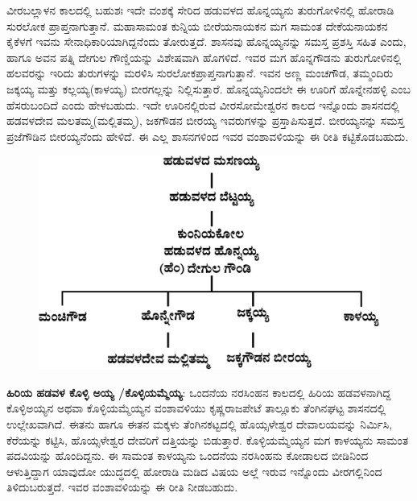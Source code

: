 ವೀರಬಲ್ಲಾಳನ ಕಾಲದಲ್ಲಿ ಬಹುಶಃ ಇದೇ ವಂಶಕ್ಕೆ ಸೇರಿದ ಹಡುವಳದ ಹೊನ್ನಯ್ಯನು ತುರುಗೋಳಿನಲ್ಲಿ ಹೋರಾಡಿ ಸುರಲೋಕ ಪ್ರಾಪ್ತನಾಗುತ್ತಾನೆ. ಮಹಾಸಾಮಂತ ಕುನ್ನಿಯ ಬೀರೆಯನಾಯಕನ ಮಗ ಸಾಮಂತ ದೇಕೆಯನಾಯಕನ ಕೈಕೆಳಗೆ ಇವನು ಸೇನಾಧಿಕಾರಿಯಾಗಿದ್ದನೆಂದು ತೋರುತ್ತದೆ. ಶಾಸನವು ಹೊನ್ನಯ್ಯನನ್ನು ಸಮಸ್ತ ಪ್ರಶಸ್ತಿ ಸಹಿತ ಎಂದು, ಹಾಗೂ ಅವನ ಪತ್ನಿ ದೇಗುಲ ಗೌಣ್ಡಿಯನ್ನು ವಿಶೇಷವಾಗಿ ಹೊಗಳಿದೆ. ಇವರ ಮಗ ಹೊನ್ನಗೌಡನು ತುರುಗೋಳಿನಲ್ಲಿ ಹಲವರನ್ನು ಇರಿದು ತುರುಗಳನ್ನು ಮರಳಿಸಿ ಸುರಲೋಕಪ್ರಾಪ್ತನಾಗುತ್ತಾನೆ. ಇವನ ಅಣ್ಣ ಮಂಚಗೌಡ, ತಮ್ಮಂದಿರು ಜಕ್ಕಯ್ಯ ಮತ್ತು ಕಲ್ಲಯ್ಯ(ಕಾಳಯ್ಯ) ಬೀರಗಲ್ಲನ್ನು ನಿಲ್ಲಿಸುತ್ತಾರೆ. ಹೊನ್ನಯ್ಯನಿಂದಲೇ ಈ ಊರಿಗೆ ಹೊನ್ನೇನಹಳ್ಳಿ ಎಂಬ ಹೆಸರುಬಂದಿದೆ ಎಂದು ಹೇಳಬಹುದು. ಇದೇ ಊರಿನಲ್ಲಿರುವ ವೀರಸೋಮೇಶ್ವರನ ಕಾಲದ ಇನ್ನೊಂದು ಶಾಸನದಲ್ಲಿ ಹಡವಳದೇವ ಮಲತಮ್ಮ(ಮಲ್ಲಿತಮ್ಮ), ಜಕಗೌಡನ ಬೀರಯ್ಯ ಇವರುಗಳನ್ನು ಪ್ರಸ್ತಾಪಿಸುತ್ತದೆ. ಬೀರಯ್ಯನನ್ನು ಸಮಸ್ತ ಪ್ರಜೆಗೌಡಿನ ಬೀರಯ್ಯನೆಂದು ಹೇಳಿದೆ. ಈ ಎಲ್ಲ ಶಾಸನಗಳಿಂದ ಇವರ ವಂಶಾವಳಿಯನ್ನು ಈ ರೀತಿ ಕಟ್ಟಿಕೊಡಬಹುದು.

\begin{figure}[H]
\includegraphics[scale=.15]{images/chap3/chap3fig32.jpeg}
\end{figure}

\textbf{ಹಿರಿಯ ಹಡವಳ ಕೊಳ್ಳಿ ಅಯ್ಯ /ಕೊಳ್ಳಿಯಮ್ಮೆಯ್ಯ}: ಒಂದನೆಯ ನರಸಿಂಹನ ಕಾಲದಲ್ಲಿ ಹಿರಿಯ ಹಡವಳನಾಗಿದ್ದ ಕೊಳ್ಳಿಅಯ್ಯನ ಅಥವಾ ಕೊಳ್ಳಿಯಮ್ಮೆಯ್ಯನ ವಂಶಾವಳಿಯು ಕೃಷ್ಣರಾಜಪೇಟೆ ತಾಲ್ಲೂಕು ತೆಂಗಿನಘಟ್ಟ ಶಾಸನದಲ್ಲಿ ಉಲ್ಲೇಖ\-ವಾಗಿದೆ. ಈತನು ಹಾಗೂ ಈತನ ಮಕ್ಕಳು ತೆಂಗಿನಕಟ್ಟದಲ್ಲಿ ಹೊಯ್ಸಳೇಶ್ವರ ದೇವಾಲಯವನ್ನು ನಿರ್ಮಿಸಿ, ಕೆರೆಯನ್ನು ಕಟ್ಟಿಸಿ, ಹೊಯ್ಸಳೇಶ್ವರ ದೇವರಿಗೆ ದತ್ತಿಯನ್ನು ಬಿಡುತ್ತಾರೆ. ಕೊಳ್ಳಿಯಮ್ಮೆಯ್ಯನ ಮಗ ಕಾಳಯ್ಯನು ಸಾಮಂತ ಪದವಿಯನ್ನು ಹೊಂದಿದ್ದನು. ಈ ಸಾಮಂತ ಕಾಳಯ್ಯನು ಒಂದನೆಯ ನರಸಿಂಹನು ಕೋಡಾಲದ ಬೀಡಿನಿಂದ ಆಳುತ್ತಿದ್ದಾಗ ಯಾವುದೋ ಯುದ್ಧದಲ್ಲಿ ಹೋರಾಡಿ ಮಡಿದ ವಿಷಯ ಅಲ್ಲೆ ಇರುವ ಇನ್ನೊಂದು ವೀರಗಲ್ಲಿನಿಂದ ತಿಳಿದುಬರುತ್ತದೆ. ಇವರ ವಂಶಾವಳಿಯನ್ನು ಈ ರೀತಿ ನೀಡಬಹುದು.

